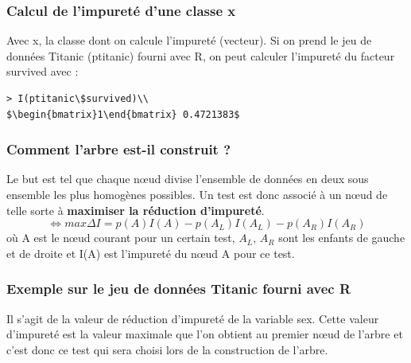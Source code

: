 \documentclass[compress]{beamer}
\begin{document}
\begin{frame}
\frametitle{Calcul de l'impureté d'une classe x}

Avec x, la classe dont on calcule l'impureté (vecteur). Si on prend le jeu de données Titanic (ptitanic) fourni avec R, on peut calculer l'impureté du facteur survived avec : \begin{verbatim}
> I(ptitanic\$survived)\\
$\begin{bmatrix}1\end{bmatrix} 0.4721383$ \end{verbatim}
\end{frame}
\begin{frame}
\frametitle{Comment l'arbre est-il construit ?}
Le but est tel que chaque nœud divise l'ensemble de données en deux sous ensemble les plus homogènes possibles.
Un test est donc associé à un nœud de telle sorte à \textbf{maximiser la réduction d'impureté}.\\
\[\Leftrightarrow max \Delta I = p(A)I(A) - p(A_L)I(A_L) - p(A_R)I(A_R)\]
où A est le nœud courant pour un certain test, $A_L$, $A_R$ sont les enfants de gauche et de droite et I(A) est l'impureté du nœud A pour ce test.
\end{frame}

\begin{frame}
\frametitle{Exemple sur le jeu de données Titanic fourni avec R}

Il s'agit de la valeur de réduction d'impureté de la variable sex. Cette valeur d'impureté est la valeur maximale que l'on obtient au premier nœud de l'arbre et c'est donc ce test qui sera choisi lors de la construction de l'arbre.
\end{frame}
\end{document}

